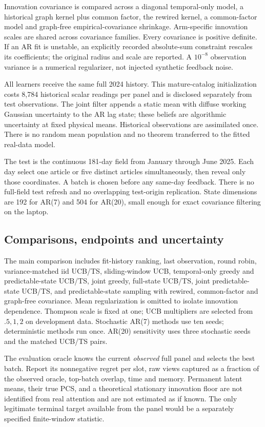 Innovation covariance is compared across a diagonal temporal-only model, a historical graph kernel plus common factor, the rewired kernel, a common-factor model and graph-free empirical-covariance shrinkage. Arm-specific innovation scales are shared across covariance families. Every covariance is positive definite. If an AR fit is unstable, an explicitly recorded absolute-sum constraint rescales its coefficients; the original radius and scale are reported. A $10^{-8}$ observation variance is a numerical regularizer, not injected synthetic feedback noise.

All learners receive the same full 2024 history. This mature-catalog initialization costs 8,784 historical scalar readings per panel and is disclosed separately from test observations. The joint filter appends a static mean with diffuse working Gaussian uncertainty to the AR lag state; these beliefs are algorithmic uncertainty at fixed physical means. Historical observations are assimilated once. There is no random mean population and no theorem transferred to the fitted real-data model.

The test is the continuous 181-day field from January through June 2025. Each day select one article or five distinct articles simultaneously, then reveal only those coordinates. A batch is chosen before any same-day feedback. There is no full-field test refresh and no overlapping test-origin replication. State dimensions are 192 for AR(7) and 504 for AR(20), small enough for exact covariance filtering on the laptop.

\subsection{Comparisons, endpoints and uncertainty}
The main comparison includes fit-history ranking, last observation, round robin, variance-matched iid UCB/TS, sliding-window UCB, temporal-only greedy and predictable-state UCB/TS, joint greedy, full-state UCB/TS, joint predictable-state UCB/TS, and predictable-state sampling with rewired, common-factor and graph-free covariance. Mean regularization is omitted to isolate innovation dependence. Thompson scale is fixed at one; UCB multipliers are selected from $.5,1,2$ on development data. Stochastic AR(7) methods use ten seeds; deterministic methods run once. AR(20) sensitivity uses three stochastic seeds and the matched UCB/TS pairs.

The evaluation oracle knows the current \emph{observed} full panel and selects the best batch. Report its nonnegative regret per slot, raw views captured as a fraction of the observed oracle, top-batch overlap, time and memory. Permanent latent means, their true PCS, and a theoretical stationary innovation floor are not identified from real attention and are not estimated as if known. The only legitimate terminal target available from the panel would be a separately specified finite-window statistic.

